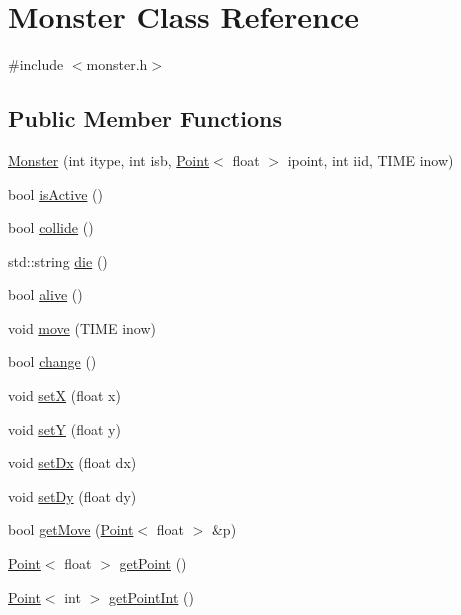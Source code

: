 \hypertarget{class_monster}{\section{Monster Class Reference}
\label{class_monster}
}


{\ttfamily \#include $<$monster.\-h$>$}

\subsection*{Public Member Functions}
\begin{DoxyCompactItemize}
\item 
\hyperlink{class_monster_aa38e6e17f59a3112597a5ae7e01f447e}{Monster} (int itype, int isb, \hyperlink{class_point}{Point}$<$ float $>$ ipoint, int iid, T\-I\-M\-E inow)
\item 
bool \hyperlink{class_monster_af558bd1fd73a39d8b179d86656d8117f}{is\-Active} ()
\item 
bool \hyperlink{class_monster_a182b79c8d97b3fee25d25019fee43dbf}{collide} ()
\item 
std\-::string \hyperlink{class_monster_a393e45e15e584ab11bbadf20dde26a73}{die} ()
\item 
bool \hyperlink{class_monster_aaa9541f9ce3e205065bfbc1f24c5cef0}{alive} ()
\item 
void \hyperlink{class_monster_a15cc199da6293b74caab06a13791d374}{move} (T\-I\-M\-E inow)
\item 
bool \hyperlink{class_monster_af0ca0f158c1e1de2b498c9c8b2b9b69a}{change} ()
\item 
void \hyperlink{class_monster_ac939d27e784e74f3f83ff75d5b07d18a}{set\-X} (float x)
\item 
void \hyperlink{class_monster_a2e2439037a4133e2d9bf2e7d97e053a8}{set\-Y} (float y)
\item 
void \hyperlink{class_monster_ad8d29c4473062514986c23f88073a8d0}{set\-Dx} (float dx)
\item 
void \hyperlink{class_monster_a946db5465ec3edcf83d67120e9665aea}{set\-Dy} (float dy)
\item 
bool \hyperlink{class_monster_ac596b26c5192997b89f9f75a3bcd2745}{get\-Move} (\hyperlink{class_point}{Point}$<$ float $>$ \&p)
\item 
\hyperlink{class_point}{Point}$<$ float $>$ \hyperlink{class_monster_ac13c82f6368a4f0aa88d4fa18373413c}{get\-Point} ()
\item 
\hyperlink{class_point}{Point}$<$ int $>$ \hyperlink{class_monster_a8420f6b189642b5ce0d00c33a8538c88}{get\-Point\-Int} ()

\end{DoxyCompactItemize}
